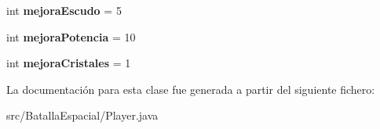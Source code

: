 \begin{DoxyCompactItemize}
\item 
\hypertarget{classBatallaEspacial_1_1Player_af58c44be76605c755a6145f2cdb5eb03}{
int {\bfseries mejoraEscudo} = 5}
\label{classBatallaEspacial_1_1Player_af58c44be76605c755a6145f2cdb5eb03}

\item 
\hypertarget{classBatallaEspacial_1_1Player_a27154ef714977760a0ff8a2b4d2d1d3c}{
int {\bfseries mejoraPotencia} = 10}
\label{classBatallaEspacial_1_1Player_a27154ef714977760a0ff8a2b4d2d1d3c}

\item 
\hypertarget{classBatallaEspacial_1_1Player_a72373a209d11472635eb7015149f4c50}{
int {\bfseries mejoraCristales} = 1}
\label{classBatallaEspacial_1_1Player_a72373a209d11472635eb7015149f4c50}

\end{DoxyCompactItemize}


La documentación para esta clase fue generada a partir del siguiente fichero:\begin{DoxyCompactItemize}
\item 
src/BatallaEspacial/Player.java\end{DoxyCompactItemize}
